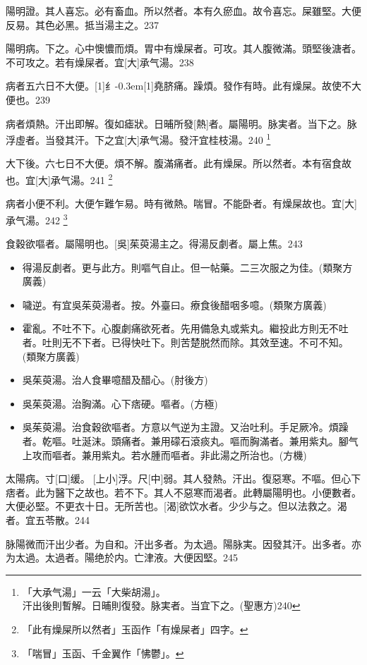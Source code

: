 \documentclass[11pt,oneside,b5paper]{ctexbook}
\begin{document}
\begin{flushleft}
陽明證。其人喜忘。必有畜血。所以然者。本有久瘀血。故令喜忘。屎雖堅。大便反易。其色必黑。抵当湯主之。237

陽明病。下之。心中懊憹而煩。胃中有燥屎者。可攻。其人腹微滿。頭堅後溏者。不可攻之。若有燥屎者。宜[大]承气湯。238

病者五六日不大便。{\hbox{\scalebox{0.6}[1]{纟}\kern-0.3em\scalebox{0.63}[1]{堯}}}脐痛。躁煩。發作有時。此有燥屎。故使不大便也。239

病者煩熱。汗出即解。復如瘧狀。日晡所發[熱]者。屬陽明。脉実者。当下之。脉浮虛者。当發其汗。下之宜[大]承气湯。發汗宜桂枝湯。240
\footnote{「大承气湯」一云「大柴胡湯」。\\汗出後則暫解。日晡則復發。脉実者。当宜下之。(聖惠方)240}

大下後。六七日不大便。煩不解。腹滿痛者。此有燥屎。所以然者。本有宿食故也。宜[大]承气湯。241
\footnote{「此有燥屎所以然者」玉函作「有燥屎者」四字。}

病者小便不利。大便乍難乍易。時有微熱。喘冒。不能卧者。有燥屎故也。宜[大]承气湯。242
\footnote{「喘冒」玉函、千金翼作「怫鬱」。}

食穀欲嘔者。屬陽明也。[吳]茱萸湯主之。得湯反劇者。屬上焦。243

\begin{itemize}
\item 得湯反劇者。更与此方。則嘔气自止。但一帖藥。二三次服之为佳。(類聚方廣義)
\item 噦逆。有宜吳茱萸湯者。按。外臺曰。療食後醋咽多噫。(類聚方廣義)
\item 霍亂。不吐不下。心腹劇痛欲死者。先用備急丸或紫丸。繼投此方則无不吐者。吐則无不下者。已得快吐下。則苦楚脱然而除。其效至速。不可不知。(類聚方廣義)
\item 吳茱萸湯。治人食畢噫醋及醋心。(肘後方)
\item 吳茱萸湯。治胸滿。心下痞硬。嘔者。(方極)
\item 吳茱萸湯。治食穀欲嘔者。方意以气逆为主證。又治吐利。手足厥冷。煩躁者。乾嘔。吐涎沫。頭痛者。兼用礞石滾痰丸。嘔而胸滿者。兼用紫丸。腳气上攻而嘔者。兼用紫丸。若水腫而嘔者。非此湯之所治也。(方機)
\end{itemize}

太陽病。寸[口]缓。{𬮦}[上小]浮。尺[中]弱。其人發熱。汗出。復惡寒。不嘔。但心下痞者。此为醫下之故也。若不下。其人不惡寒而渴者。此轉屬陽明也。小便數者。大便必堅。不更衣十日。无所苦也。[渴]欲饮水者。少少与之。但以法救之。渴者。宜五苓散。244

脉陽微而汗出少者。为自和。汗出多者。为太過。陽脉実。因發其汗。出多者。亦为太過。太過者。陽绝於内。亡津液。大便因堅。245


\end{flushleft}
\end{document}
